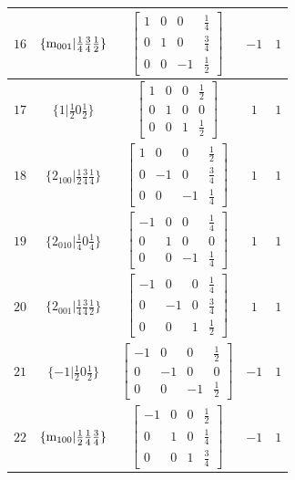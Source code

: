 \documentclass[fleqn,8pt]{jsarticle}
\begin{document}
\begin{longtable}{ccccc}
$ 16 $ & $ \{{\rm m}_{001}|\frac{1}{4} \frac{3}{4} \frac{1}{2}\} $ & $ \begin{bmatrix} 1 & 0 & 0 & \frac{1}{4} \\ 0 & 1 & 0 & \frac{3}{4} \\ 0 & 0 & -1 & \frac{1}{2} \end{bmatrix} $ & $ -1 $ & $ 1 $ \\ \hline
$ 17 $ & $ \{1|\frac{1}{2} 0 \frac{1}{2}\} $ & $ \begin{bmatrix} 1 & 0 & 0 & \frac{1}{2} \\ 0 & 1 & 0 & 0 \\ 0 & 0 & 1 & \frac{1}{2} \end{bmatrix} $ & $ 1 $ & $ 1 $ \\ \hline
$ 18 $ & $ \{2{}_{100}|\frac{1}{2} \frac{3}{4} \frac{1}{4}\} $ & $ \begin{bmatrix} 1 & 0 & 0 & \frac{1}{2} \\ 0 & -1 & 0 & \frac{3}{4} \\ 0 & 0 & -1 & \frac{1}{4} \end{bmatrix} $ & $ 1 $ & $ 1 $ \\ \hline
$ 19 $ & $ \{2{}_{010}|\frac{1}{4} 0 \frac{1}{4}\} $ & $ \begin{bmatrix} -1 & 0 & 0 & \frac{1}{4} \\ 0 & 1 & 0 & 0 \\ 0 & 0 & -1 & \frac{1}{4} \end{bmatrix} $ & $ 1 $ & $ 1 $ \\ \hline
$ 20 $ & $ \{2{}_{001}|\frac{1}{4} \frac{3}{4} \frac{1}{2}\} $ & $ \begin{bmatrix} -1 & 0 & 0 & \frac{1}{4} \\ 0 & -1 & 0 & \frac{3}{4} \\ 0 & 0 & 1 & \frac{1}{2} \end{bmatrix} $ & $ 1 $ & $ 1 $ \\ \hline
$ 21 $ & $ \{-1|\frac{1}{2} 0 \frac{1}{2}\} $ & $ \begin{bmatrix} -1 & 0 & 0 & \frac{1}{2} \\ 0 & -1 & 0 & 0 \\ 0 & 0 & -1 & \frac{1}{2} \end{bmatrix} $ & $ -1 $ & $ 1 $ \\ \hline
$ 22 $ & $ \{{\rm m}_{100}|\frac{1}{2} \frac{1}{4} \frac{3}{4}\} $ & $ \begin{bmatrix} -1 & 0 & 0 & \frac{1}{2} \\ 0 & 1 & 0 & \frac{1}{4} \\ 0 & 0 & 1 & \frac{3}{4} \end{bmatrix} $ & $ -1 $ & $ 1 $ \\ \hline

\end{longtable}
\end{document}
